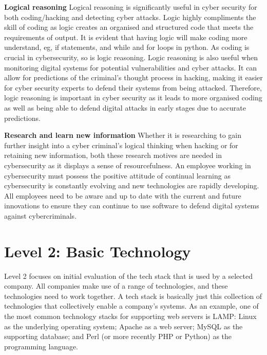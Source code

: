 \documentclass[a4paper, 11pt]{report}
\begin{document}
\textbf{Logical reasoning}
Logical reasoning is significantly useful in cyber security for both coding/hacking and detecting cyber attacks. Logic highly compliments the skill of coding as logic creates an organised and structured code that meets the requirements of output. It is evident that having logic will make coding more understand, eg, if statements, and while and for loops in python. As coding is crucial in cybersecurity, so is logic reasoning. Logic reasoning is also useful when monitoring digital systems for potential vulnerabilities and cyber attacks. It can allow for predictions of the criminal’s thought process in hacking, making it easier for cyber security experts to defend their systems from being attacked. Therefore, logic reasoning is important in cyber security as it leads to more organised coding as well as being able to defend digital attacks in early stages due to accurate predictions.

\textbf{Research and learn new information}
Whether it is researching to gain further insight into a cyber criminal’s logical thinking when hacking or for retaining new information, both these research motives are needed in cybersecurity as it displays a sense of resourcefulness. An employee working in cybersecurity must possess the positive attitude of continual learning as cybersecurity is constantly evolving and new technologies are rapidly developing. All employees need to be aware and up to date with the current and future innovations to ensure they can continue to use software to defend digital systems against cybercriminals.



\newpage
\section{Level 2: Basic Technology}

Level 2 focuses on initial evaluation of the tech stack that is used by a selected company. All companies make use of a range of technologies, and these technologies need to work together. A tech stack is basically just this collection of technologies that collectively enable a company's systems. As an example, one of the most common technology stacks for supporting web servers is LAMP: Linux as the underlying operating system; Apache as a web server; MySQL as the supporting database; and Perl (or more recently PHP or Python) as the programming language.
\end{document}
